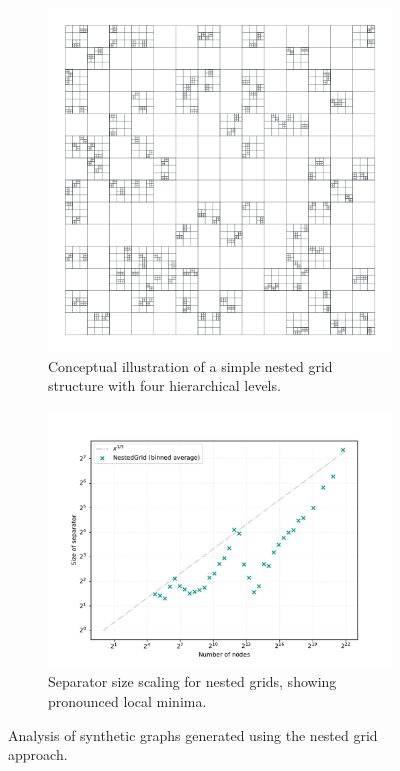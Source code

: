 \begin{figure}[tbhp]
	\centering
	\begin{subfigure}{0.35\linewidth}
		\centering
		\includegraphics[width=\linewidth]{graphics/nestedgrid.pdf}
		\caption{Conceptual illustration of a simple nested grid structure with four hierarchical levels.}
		\label{fig:nested_grid_viz}
	\end{subfigure}
	\hfill
	\begin{subfigure}{0.55\linewidth}
		\centering
		\includegraphics[width=\linewidth]{graphics/sep-nestedgrid.pdf}
		\caption{Separator size scaling for nested grids, showing pronounced local minima.}
		\label{fig:nested_grid_sep_plot}
	\end{subfigure}
	\caption{Analysis of synthetic graphs generated using the nested grid approach.}
	\label{fig:nested_grid_analysis}
\end{figure}

